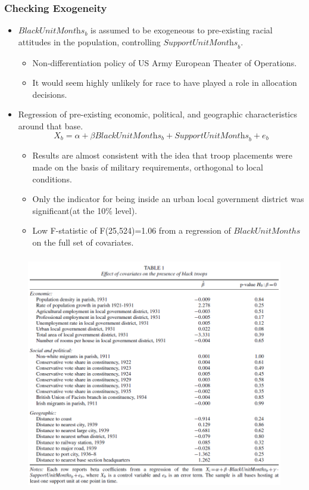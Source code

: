 \documentclass[dvipdfmx,11pt]{beamer}
\begin{document}
\begin{frame}\frametitle{Checking Exogeneity}
  \begin{itemize}
    \item $\textit{BlackUnitMonths}_b$ is assumed to be exogeneous to pre-existing racial attitudes in the population, controlling $\textit{SupportUnitMonths}_b$.
    \begin{itemize}
      \item Non-differentiation policy of US Army European Theater of Operations.
      \item It would seem highly unlikely for race to have played a role in allocation decisions.
    \end{itemize}
    \item Regression of pre-existing economic, political, and geographic characteristics around that base.
    \[
    X_b = \alpha + \beta \textit{BlackUnitMonths}_b + \textit{SupportUnitMonths}_b + e_b
    \]
    \begin{itemize}
      \item Results are almost consistent with the idea that troop placements were made on the basis of military requirements, orthogonal to local conditions.
      \item Only the indicator for being inside an urban local government district was significant(at the 10\% level).
      \item Low F-statistic of F(25,524)=1.06 from a regression of $BlackUnitMonths$ on the full set of covariates.
    \end{itemize}
  \end{itemize}
\end{frame}

\begin{frame}\frametitle{}
  \begin{figure}
    \centering
    \includegraphics[scale = .6]{os1027tanji/T1}
  \end{figure}
\end{frame}
\end{document}
